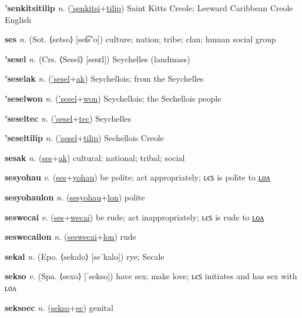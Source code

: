 \textbf{\hypertarget{'senkitsitilip}{'senkitsitilip}} \textit{n.} (\hyperlink{'senkitsi}{'senkitsi}+\allowbreak \hyperlink{tilip}{tilip})
Saint Kitts Creole; Leeward Caribbean Creole English

\textbf{\hypertarget{ses}{ses}} \textit{n.} (Sot. ⟨setso⟩ [set͡sʼo])
culture; nation; tribe; clan; human social group

\textbf{\hypertarget{'sesel}{'sesel}} \textit{n.} (Crs. ⟨Sesel⟩ [sesɛl])
Seychelles (landmass)

\textbf{\hypertarget{'seselak}{'seselak}} \textit{n.} (\hyperlink{'sesel}{'sesel}+\allowbreak \hyperlink{ak}{ak})
Seychellois; from the Seychelles

\textbf{\hypertarget{'seselwon}{'seselwon}} \textit{n.} (\hyperlink{'sesel}{'sesel}+\allowbreak \hyperlink{won}{won})
Seychellois; the Sechellois people

\textbf{\hypertarget{'seseltec}{'seseltec}} \textit{n.} (\hyperlink{'sesel}{'sesel}+\allowbreak \hyperlink{tec}{tec})
Seychelles

\textbf{\hypertarget{'seseltilip}{'seseltilip}} \textit{n.} (\hyperlink{'sesel}{'sesel}+\allowbreak \hyperlink{tilip}{tilip})
Sechellois Creole

\textbf{\hypertarget{sesak}{sesak}} \textit{n.} (\hyperlink{ses}{ses}+\allowbreak \hyperlink{ak}{ak})
cultural; national; tribal; social

\textbf{\hypertarget{sesyohau}{sesyohau}} \textit{v.} (\hyperlink{ses}{ses}+\allowbreak \hyperlink{yohau}{yohau})
be polite; act appropriately; ʟєꜱ is polite to \hyperlink{sesyohaulon}{ʟᴏᴧ}

\textbf{\hypertarget{sesyohaulon}{sesyohaulon}} \textit{n.} (\hyperlink{sesyohau}{sesyohau}+\allowbreak \hyperlink{lon}{lon})
polite

\textbf{\hypertarget{seswecai}{seswecai}} \textit{v.} (\hyperlink{ses}{ses}+\allowbreak \hyperlink{wecai}{wecai})
be rude; act inappropriately; ʟєꜱ is rude to \hyperlink{seswecailon}{ʟᴏᴧ}

\textbf{\hypertarget{seswecailon}{seswecailon}} \textit{n.} (\hyperlink{seswecai}{seswecai}+\allowbreak \hyperlink{lon}{lon})
rude

\textbf{\hypertarget{sekal}{sekal}} \textit{n.} (Epo. ⟨sekalo⟩ [seˈkalo])
rye; Secale

\textbf{\hypertarget{sekso}{sekso}} \textit{v.} (Spa. ⟨sexo⟩ [ˈsekso])
have sex; make love; ʟєꜱ initiates and has sex with ʟᴏᴧ

\textbf{\hypertarget{seksoec}{seksoec}} \textit{n.} (\hyperlink{sekso}{sekso}+\allowbreak \hyperlink{ec}{ec})
genital

